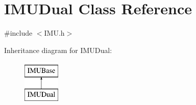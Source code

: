 \hypertarget{class_i_m_u_dual}{
\section{IMUDual Class Reference}
\label{class_i_m_u_dual}
}


{\ttfamily \#include $<$IMU.h$>$}

Inheritance diagram for IMUDual:\begin{figure}[H]
\begin{center}
\leavevmode
\includegraphics[height=2.000000cm]{class_i_m_u_dual}
\end{center}
\end{figure}

